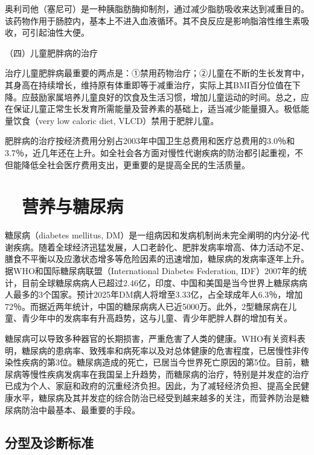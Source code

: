 奥利司他（塞尼可）是一种胰脂肪酶抑制剂，通过减少脂肪吸收来达到减重目的。该药物作用于肠腔内，基本上不进入血液循环。其不良反应是影响脂溶性维生素吸收，可引起油性大便。

（四）儿童肥胖病的治疗

治疗儿童肥胖病最重要的两点是：①禁用药物治疗；②儿童在不断的生长发育中，其身高在持续增长，维持原有体重即等于减重治疗，实际上其BMI百分位值在下降。应鼓励家属培养儿童良好的饮食及生活习惯，增加儿童运动的时间。总之，应在保证儿童正常生长发育所需能量及营养素的基础上，适当减少能量摄入。极低能量饮食（very
low caloric diet, VLCD）禁用于肥胖儿童。

肥胖病的治疗按经济费用分别占2003年中国卫生总费用和医疗总费用的3.0％和3.7％，近几年还在上升。如全社会各方面对慢性代谢疾病的防治都引起重视，不但能降低全社会医疗费用支出，更重要的是提高全民的生活质量。

\hypertarget{text00004.htmlux5cux23mllj18}{%
\section{　营养与糖尿病}\label{text00004.htmlux5cux23mllj18}}

糖尿病（diabetes mellitus,
DM）是一组病因和发病机制尚未完全阐明的内分泌-代谢疾病。随着全球经济迅猛发展，人口老龄化、肥胖发病率增高、体力活动不足、膳食不平衡以及应激状态增多等危险因素的迅速增加，糖尿病的发病率逐年上升。据WHO和国际糖尿病联盟（International
Diabetes Federation,
IDF）2007年的统计，目前全球糖尿病病人已超过2.46亿，印度、中国和美国是当今世界上糖尿病病人最多的3个国家。预计2025年DM病人将增至3.33亿，占全球成年人6.3％，增加72％。而据近两年统计，中国的糖尿病病人已近5000万。此外，2型糖尿病在儿童、青少年中的发病率有升高趋势，这与儿童、青少年肥胖人群的增加有关。

糖尿病可以导致多种器官的长期损害，严重危害了人类的健康。WHO有关资料表明，糖尿病的患病率、致残率和病死率以及对总体健康的危害程度，已居慢性非传染性疾病的第3位。糖尿病造成的死亡，已居当今世界死亡原因的第5位。目前，糖尿病等慢性疾病发病率在我国呈上升趋势，而糖尿病的治疗，特别是并发症的治疗已成为个人、家庭和政府的沉重经济负担。因此，为了减轻经济负担、提高全民健康水平，糖尿病及其并发症的综合防治已经受到越来越多的关注，而营养防治是糖尿病防治中最基本、最重要的手段。

\hypertarget{text00004.htmlux5cux23mllj19}{%
\subsection{分型及诊断标准}\label{text00004.htmlux5cux23mllj19}}

